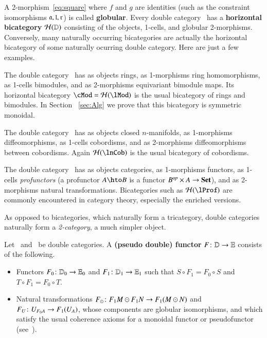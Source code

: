 \documentclass{amsart}
\begin{document}
A 2-morphism~\eqref{eq:square} where $f$ and $g$ are identities (such
as the constraint isomorphisms $\mathfrak{a},\mathfrak{l},\mathfrak{r}$) is called
\textbf{globular}.  Every double category \lD\ has a
\textbf{horizontal bicategory} $\mathcal{H}(\mathbb{D})$ consisting of the objects,
1-cells, and globular 2-morphisms.  Conversely, many naturally
occurring bicategories are actually the horizontal bicategory of some
naturally ocurring double category.  Here are just a few examples.

\begin{eg}
  The double category \lMod\ has as objects rings, as 1-morphisms ring
  homomorphisms, as 1-cells bimodules, and as 2-morphisms equivariant
  bimodule maps.  Its horizontal bicategory $\cMod = \cH(\lMod)$ is
  the usual bicategory of rings and bimodules. In Section ~\ref{sec:Alg} we prove that this bicategory is symmetric monoidal.
\end{eg}

\begin{eg}
  The double category \lnCob\ has as objects closed $n$-manifolds, as
  1-morphisms diffeomorphisms, as 1-cells cobordisms, and as
  2-morphisms diffeomorphisms between cobordisms.  Again $\cH(\lnCob)$
  is the usual bicategory of cobordisms.
\end{eg}

\begin{eg}
  The double category \lProf\ has as objects categories, as
  1-morphisms functors, as 1-cells \emph{profunctors} (a profunctor
  $A\hto B$ is a functor $B^{\mathit{op}}\times A\to \mathbf{Set}$), and as
  2-morphisms natural transformations.  Bicategories such as
  $\cH(\lProf)$ are commonly encountered in category theory,
  especially the enriched versions.
\end{eg}


As opposed to bicategories, which naturally form a tricategory, double
categories naturally form a \emph{2-category}, a much simpler object.

\begin{defn}
  Let \lD\ and \lE\ be double categories.  A \textbf{(pseudo double)
    functor} $F\colon \mathbb{D}\to \mathbb{E}$ consists of the following.
  \begin{itemize}
  \item Functors $F_0\colon \mathbb{D}_0 \to \mathbb{E}_0$ and $F_1\colon \mathbb{D}_1 \to
    \mathbb{E}_1$ such that $S\circ F_1 = F_0\circ S$ and $T\circ F_1 =
    F_0\circ T$.
  \item Natural transformations $F_\odot\colon F_1M \odot F_1N \to
    F_1(M\odot N)$ and $F_U\colon U_{F_0 A} \to F_1(U_A)$, whose
    components are globular isomorphisms, and which satisfy the usual
    coherence axioms for a monoidal functor or pseudofunctor
    (see~\cite[\S{}XI.2]{maclane}).
  \end{itemize}
\end{defn}
\end{document}
